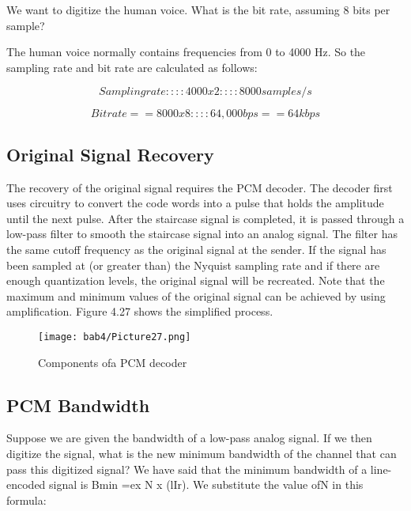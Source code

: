 \begin{example}
  We want to digitize the human voice. What is the bit rate, assuming 8 bits per sample?
\end{example}

\begin{solution}
  The human voice normally contains frequencies from 0 to 4000 Hz. So the sampling rate and bit rate are calculated as follows:
\end{solution}

\begin{equation*}
  Sampling rate :::: 4000 x 2 :::: 8000 samples/s 
\end{equation*}

\begin{equation*}
  Bit rate == 8000 x 8 :::: 64,000 bps == 64 kbps
\end{equation*}

\subsection*{Original Signal Recovery}
The recovery of the original signal requires the PCM decoder. The decoder first uses circuitry to convert the code words into a pulse that holds the amplitude until the next pulse. After the staircase signal is completed, it is passed through a low-pass filter to smooth the staircase signal into an analog signal. The filter has the same cutoff frequency as the original signal at the sender. If the signal has been sampled at (or greater than) the Nyquist sampling rate and if there are enough quantization levels, the original signal will be recreated. Note that the maximum and minimum values of the original signal can be achieved by using amplification. Figure 4.27 shows the simplified process.

\begin{figure}
  \centering
  \texttt{[image: bab4/Picture27.png]}
  \caption{Components ofa PCM decoder}
  \label{fig4:27}
\end{figure}

\subsection*{PCM Bandwidth}
Suppose we are given the bandwidth of a low-pass analog signal. If we then digitize the signal, what is the new minimum bandwidth of the channel that can pass this digitized signal? We have said that the minimum bandwidth of a line-encoded signal is Bmin =ex N x (lIr). We substitute the value ofN in this formula:

